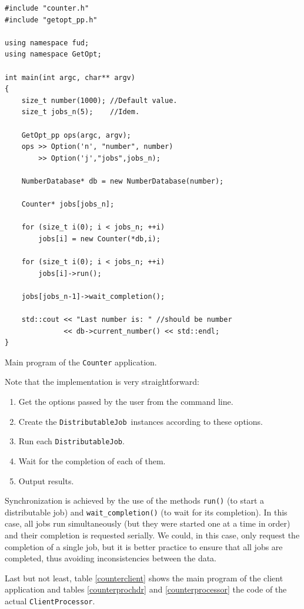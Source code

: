 \documentclass[a4paper,12pt,english]{article}
\renewcommand{\DJ}{\texttt{DistributableJob}}
\newcommand{\CP}{\texttt{ClientProcessor}}
\begin{document}
\begin{table}[!htb]
\lstset{language=C++}
\begin{lstlisting}[frame=single]
#include "counter.h"
#include "getopt_pp.h"

using namespace fud;
using namespace GetOpt;

int main(int argc, char** argv)
{
    size_t number(1000); //Default value.
    size_t jobs_n(5);    //Idem.

    GetOpt_pp ops(argc, argv);
    ops >> Option('n', "number", number) 
        >> Option('j',"jobs",jobs_n);

    NumberDatabase* db = new NumberDatabase(number);

    Counter* jobs[jobs_n];

    for (size_t i(0); i < jobs_n; ++i)
        jobs[i] = new Counter(*db,i);

    for (size_t i(0); i < jobs_n; ++i)
        jobs[i]->run();

    jobs[jobs_n-1]->wait_completion();

    std::cout << "Last number is: " //should be number
              << db->current_number() << std::endl;
}
\end{lstlisting}
\centering \caption{Main program of the \texttt{Counter} application.} \label{countermain}
\end{table}

Note that the implementation is very straightforward:
\begin{enumerate}
 \item Get the options passed by the user from the command line.
 \item Create the \DJ \ instances according to these options.
 \item Run each \DJ.
 \item Wait for the completion of each of them.
 \item Output results.
\end{enumerate}

Synchronization is achieved by the use of the methods \texttt{run()} (to start a distributable job) and \texttt{wait\_completion()} (to wait for its completion). In this case, all jobs run simultaneously (but they were started one at a time in order) and their completion is requested serially. We could, in this case, only request the completion of a single job, but it is better practice to ensure that all jobs are completed, thus avoiding inconsistencies between the data.

Last but not least, table \ref{counterclient} shows the main program of the client application and tables \ref{counterprochdr} and \ref{counterprocessor} the code of the actual \CP.
\end{document}
